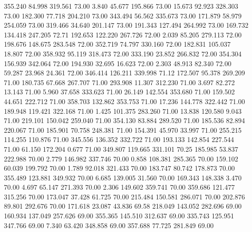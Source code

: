  355.240   84.998  319.561        73.00
   3.840   45.677  195.866        73.00
  15.673   92.923  328.303        73.00
 182.300   77.718  204.210        73.00
 343.494   56.562  335.673        73.00
 171.879   58.979  254.059        73.00
 319.466   34.640  201.147        73.00
 191.343  127.494  264.992        73.00
 169.732  134.418  247.205        72.71
 192.653  122.220  267.726        72.00
   2.039   85.205  279.113        72.00
 198.676  148.675  283.548        72.00
 352.719   74.797  330.160        72.00
 182.831  105.037   18.807        72.00
 358.932   95.119  318.473        72.00
 333.190   23.852  266.832        72.00
 354.304  156.939  342.064        72.00
 194.930   32.695   16.623        72.00
   2.303   48.913   82.340        72.00
  59.287   23.968   24.361        72.00
 346.414  126.211  339.998        71.12
 172.507   95.378  269.209        71.00
 180.735   67.668  267.707        71.00
 293.908   11.307  312.230        71.00
   3.697   82.272   13.143        71.00
   5.960   37.658  333.623        71.00
  26.149  142.554  353.680        71.00
 159.502   44.651  222.712        71.00
 358.703  132.862  353.753        71.00
  17.236  144.778  322.442        71.00
 189.948  119.421  322.168        71.00
   1.425  101.375  283.260        71.00
  13.838  120.580    9.043        71.00
 219.101  150.042  259.040        71.00
 354.130   83.884  289.520        71.00
 185.536   82.894  220.067        71.00
 185.901   70.758  248.381        71.00
 154.391   45.970   33.997        71.00
 255.215  114.255  110.876        71.00
 345.556  136.352  332.722        71.00
 193.133  142.854  227.544        71.00
  61.150  172.204    0.677        71.00
 349.807  119.665  331.101        70.25
 185.985   53.837  222.988        70.00
   2.779  146.982  337.746        70.00
   0.858  108.381  285.365        70.00
 159.102   60.039  199.792        70.00
   1.789   92.018  321.433        70.00
 183.747   80.742  178.873        70.00
 355.489  123.881  349.932        70.00
   6.685  139.005   31.560        70.00
 169.343  148.338    3.470        70.00
   4.697   65.147  271.393        70.00
   2.306  149.602  359.741        70.00
 359.686  121.477  315.256        70.00
 173.047   37.428   61.725        70.00
 215.484  150.581  286.071        70.00
 202.876   89.801  292.676        70.00
 171.618   23.087   43.836        69.58
 218.049  143.052  282.696        69.00
 160.934  137.049  257.626        69.00
 355.365  145.510  312.637        69.00
 335.743  125.951  347.766        69.00
   7.340   63.420  348.858        69.00
 357.688   77.725  281.849        69.00
